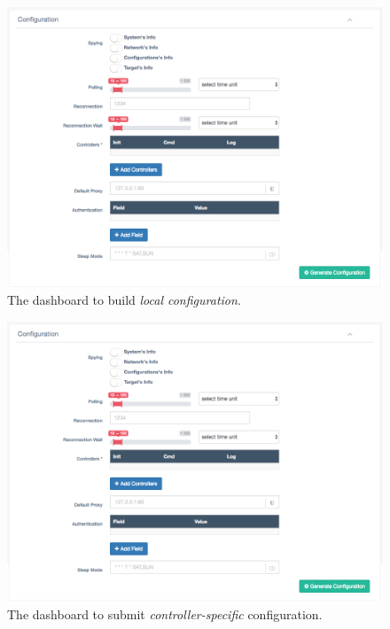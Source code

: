 \begin{figure}[h]
  \centering
  \includegraphics[scale=0.45]{./fig/configurationWUI.png}
  \caption{The dashboard to build \textit{local configuration}.}
    \label{fig:configuration-dashboard}
\end{figure}

\begin{figure}[h]
	\centering
	\includegraphics[scale=0.45]{./fig/configurationWUI.png}
	\caption{The dashboard to submit \textit{controller-specific} configuration.}
	\label{fig:initialization-dashboard}
\end{figure}
